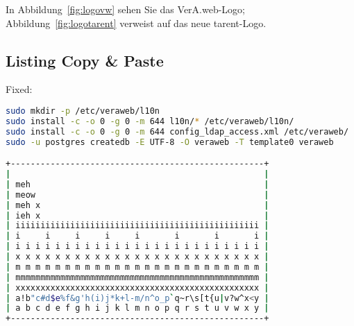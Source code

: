 \documentclass{tarentanleitung}
\begin{document}
In Abbildung~\ref{fig:logovw} sehen Sie das VerA.web-Logo;
Abbildung~\ref{fig:logotarent} verweist auf das neue tarent-Logo.

\subsection{Listing Copy \& Paste}

\begin{minipage}{\textwidth}
Fixed:

\begin{lstlisting}[language=sh,columns=fixed]
sudo mkdir -p /etc/veraweb/l10n
sudo install -c -o 0 -g 0 -m 644 l10n/* /etc/veraweb/l10n/
sudo install -c -o 0 -g 0 -m 644 config_ldap_access.xml /etc/veraweb/
sudo -u postgres createdb -E UTF-8 -O veraweb -T template0 veraweb

+---------------------------------------------------+
|                                                   |
| meh                                               |
| meow                                              |
| meh x                                             |
| ieh x                                             |
| iiiiiiiiiiiiiiiiiiiiiiiiiiiiiiiiiiiiiiiiiiiiiiiii |
| i     i     i     i     i       i       i       i |
| i i i i i i i i i i i i i i i i i i i i i i i i i |
| x x x x x x x x x x x x x x x x x x x x x x x x x |
| m m m m m m m m m m m m m m m m m m m m m m m m m |
| mmmmmmmmmmmmmmmmmmmmmmmmmmmmmmmmmmmmmmmmmmmmmmmmm |
| xxxxxxxxxxxxxxxxxxxxxxxxxxxxxxxxxxxxxxxxxxxxxxxxx |
| a!b"c#d$e%f&g'h(i)j*k+l-m/n^o_p`q~r\s[t{u|v?w^x<y |
| a b c d e f g h i j k l m n o p q r s t u v w x y |
+---------------------------------------------------+

\end{lstlisting}
\end{minipage}
\end{document}
